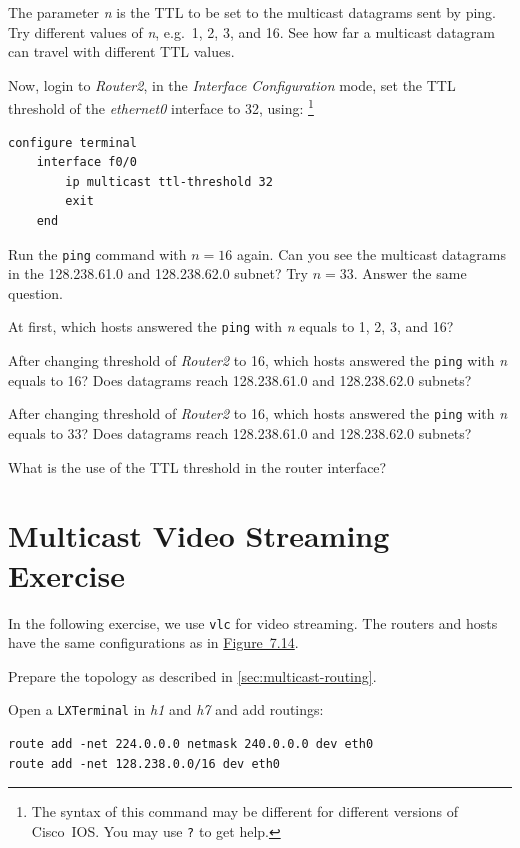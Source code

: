 \documentclass{../UTNetLab}
\begin{document}
    The parameter \textit{n} is the TTL to be set to the multicast datagrams sent by ping.
    Try different values of \textit{n}, e.g.\ 1, 2, 3, and 16.
    See how far a multicast datagram can travel with different TTL values. 

    Now, login to \textit{Router2}, in the \textit{Interface Configuration} mode, set the TTL threshold of the \textit{ethernet0} interface to 32, using:%
    \footnote{The syntax of this command may be different for different versions of Cisco~IOS. You may use \lstinline[language={cisco}]{?} to get help.}
    \begin{lstlisting}[language={cisco}]    
configure terminal
    interface f0/0
        ip multicast ttl-threshold 32
        exit
    end
    \end{lstlisting}

    Run the \lstinline{ping} command with $n = 16$ again.
    Can you see the multicast datagrams in the 128.238.61.0 and 128.238.62.0 subnet?
    Try $n = 33$.
    Answer the same question.
    
    \begin{report}
    \item At first, which hosts answered the \lstinline{ping} with \textit{n} equals to 1, 2, 3, and 16?
    \item After changing threshold of \textit{Router2} to 16, which hosts answered the \lstinline{ping} with \textit{n} equals to 16?
    Does datagrams reach 128.238.61.0 and 128.238.62.0 subnets?
    \item After changing threshold of \textit{Router2} to 16, which hosts answered the \lstinline{ping} with \textit{n} equals to 33?
    Does datagrams reach 128.238.61.0 and 128.238.62.0 subnets?
    
    \item What is the use of the TTL threshold in the router interface?
    \end{report}

\part{Multicast Video Streaming Exercise}
    In the following exercise, we use \lstinline{vlc} for video streaming.
    The routers and hosts have the same configurations as in \hyperref[fig:7.14]{Figure~7.14}.

    Prepare the topology as described in \autoref{sec:multicast-routing}.

    Open a \texttt{LXTerminal} in \textit{h1} and \textit{h7} and add routings:
    \begin{lstlisting}[emph={eth0}]
route add -net 224.0.0.0 netmask 240.0.0.0 dev eth0
route add -net 128.238.0.0/16 dev eth0
    \end{lstlisting}
\end{document}
